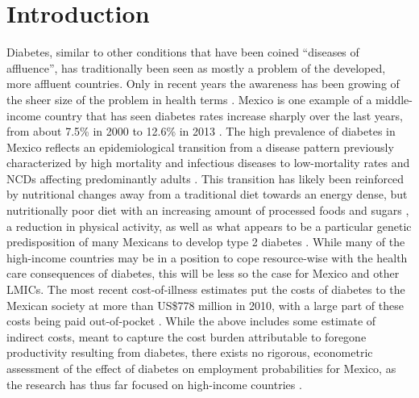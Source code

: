 \section{\label{sec:Introduction3}Introduction}

Diabetes, similar to other conditions that have been coined ``diseases of affluence'', has traditionally been seen as mostly a problem of the developed, more affluent countries. Only in recent
years the awareness has been growing of the sheer size of the problem
in health terms \parencite{Yach2006,Hu2011}. Mexico is one example of
a middle-income country that has seen diabetes rates increase sharply
over the last years, from about 7.5\% in 2000 \parencite{Barquera2013}
to 12.6\% in 2013 \parencite{InternationalDiabetesFederation2013}.
The high prevalence of diabetes in Mexico reflects an epidemiological
transition from a disease pattern previously characterized by high
mortality and infectious diseases to low-mortality rates and \acp{NCD}
affecting predominantly adults \parencite{Stevens2008}. This transition
has likely been reinforced by nutritional changes away from a traditional
diet towards an energy dense, but nutritionally poor diet with an
increasing amount of processed foods and sugars \parencite{Barquera2008b,Basu2013,Rivera2004},
a reduction in physical activity, as well as what appears to be a
particular genetic predisposition of many Mexicans to develop type
2 diabetes \parencite{Williams2013}. While many of the high-income countries
may be in a position to cope resource-wise with the health care consequences
of diabetes, this will be less so the case for Mexico and other \acp{LMIC}.
The most recent cost-of-illness estimates put the costs of diabetes
to the Mexican society at more than US\$778 million in 2010, with
a large part of these costs being paid out-of-pocket \parencite{A.2011z}.
While the above includes some estimate of indirect costs, meant to
capture the cost burden attributable to foregone productivity resulting
from diabetes, there exists no rigorous, econometric assessment of
the effect of diabetes on employment probabilities for Mexico, as the research
has thus far focused on high-income countries \parencite{Lin2011b,Latif2009,Brown2005,Minor2011,Bastida2002,Vijan2004,Zhang2009}.

